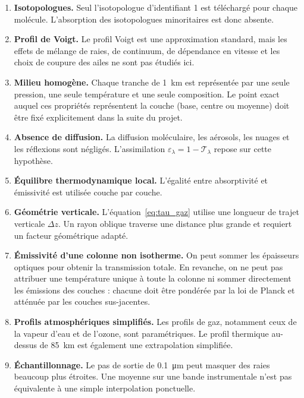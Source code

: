 \documentclass[11pt,a4paper]{article}
\begin{document}
\begin{enumerate}
  \item \textbf{Isotopologues.} Seul l'isotopologue d'identifiant 1 est
  téléchargé pour chaque molécule. L'absorption des isotopologues minoritaires
  est donc absente.

  \item \textbf{Profil de Voigt.} Le profil Voigt est une approximation
  standard, mais les effets de mélange de raies, de continuum, de dépendance
  en vitesse et les choix de coupure des ailes ne sont pas étudiés ici.

  \item \textbf{Milieu homogène.} Chaque tranche de \SI{1}{\kilo\metre} est
  représentée par une seule pression, une seule température et une seule
  composition. Le point exact auquel ces propriétés représentent la couche
  (base, centre ou moyenne) doit être fixé explicitement dans la suite du
  projet.

  \item \textbf{Absence de diffusion.} La diffusion moléculaire, les aérosols,
  les nuages et les réflexions sont négligés. L'assimilation
  $\varepsilon_\lambda=1-\mathcal{T}_\lambda$ repose sur cette hypothèse.

  \item \textbf{Équilibre thermodynamique local.} L'égalité entre
  absorptivité et émissivité est utilisée couche par couche.

  \item \textbf{Géométrie verticale.} L'équation~\eqref{eq:tau_gaz} utilise
  une longueur de trajet verticale $\Delta z$. Un rayon oblique traverse une
  distance plus grande et requiert un facteur géométrique adapté.

  \item \textbf{Émissivité d'une colonne non isotherme.} On peut sommer les
  épaisseurs optiques pour obtenir la transmission totale. En revanche, on ne
  peut pas attribuer une température unique à toute la colonne ni sommer
  directement les émissions des couches : chacune doit être pondérée par la
  loi de Planck et atténuée par les couches sus-jacentes.

  \item \textbf{Profils atmosphériques simplifiés.} Les profils de gaz,
  notamment ceux de la vapeur d'eau et de l'ozone, sont paramétriques. Le
  profil thermique au-dessus de \SI{85}{\kilo\metre} est également une
  extrapolation simplifiée.

  \item \textbf{Échantillonnage.} Le pas de sortie de
  \SI{0.1}{\micro\metre} peut masquer des raies beaucoup plus étroites. Une
  moyenne sur une bande instrumentale n'est pas équivalente à une simple
  interpolation ponctuelle.
\end{enumerate}
\end{document}
